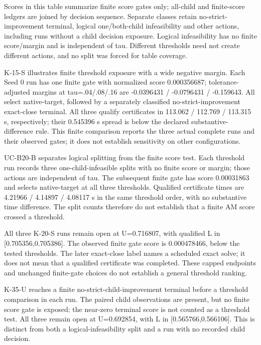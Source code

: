 \documentclass[
  american,
  11pt,
]{article}
\begin{document}
Scores in this table summarize finite score gates only; all-child and
finite-score ledgers are joined by decision sequence. Separate classes
retain no-strict-improvement terminal, logical one/both-child
infeasibility and other actions, including runs without a child decision
exposure. Logical infeasibility has no finite score/margin and is
independent of tau. Different thresholds need not create different
actions, and no split was forced for table coverage.

K-15-S illustrates finite threshold exposure with a wide negative
margin. Each Seed 0 run has one finite gate with normalized score
0.000356687; tolerance-adjusted margins at tau=.04/.08/.16 are
-0.0396431 / -0.0796431 / -0.159643. All select native-target, followed
by a separately classified no-strict-improvement exact-close terminal.
All three qualify certificates in 113.062 / 112.769 / 113.315 s,
respectively; their 0.545396 s spread is below the declared
substantive-difference rule. This finite comparison reports the three
actual complete runs and their observed gates; it does not establish
sensitivity on other configurations.

UC-B20-B separates logical splitting from the finite score test. Each
threshold run records three one-child-infeasible splits with no finite
score or margin; those actions are independent of tau. The subsequent
finite gate has score 0.00031863 and selects native-target at all three
thresholds. Qualified certificate times are 4.21966 / 4.14897 / 4.08117
s in the same threshold order, with no substantive time difference. The
split counts therefore do not establish that a finite AM score crossed a
threshold.

All three K-20-S runs remain open at U=0.716807, with qualified L in
{[}0.705356,0.705386{]}. The observed finite gate score is 0.000478466,
below the tested thresholds. The later exact-close label names a
scheduled exact solve; it does not mean that a qualified certificate was
completed. These capped endpoints and unchanged finite-gate choices do
not establish a general threshold ranking.

K-35-U reaches a finite no-strict-child-improvement terminal before a
threshold comparison in each run. The paired child observations are
present, but no finite score gate is exposed; the near-zero terminal
score is not counted as a threshold test. All three remain open at
U=0.692854, with L in {[}0.565766,0.566106{]}. This is distinct from
both a logical-infeasibility split and a run with no recorded child
decision.
\end{document}
